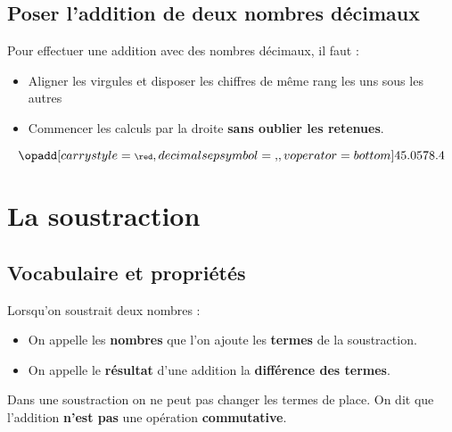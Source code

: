 \begin{pageCours}

\subsection{Poser l'addition de deux nombres décimaux}

\begin{Mt}
Pour effectuer une addition avec des nombres décimaux, il faut :
\begin{itemize}
    \item Aligner les virgules et disposer les chiffres de même rang les uns sous les autres
    \item Commencer les calculs par la droite \textbf{sans oublier les retenues}.
\end{itemize}
\bigskip
\[\opadd[carrystyle=\scriptsize\red,
decimalsepsymbol={,},
voperator=bottom]{45.05}{78.4}\]
\end{Mt} 


\section{La soustraction}

\subsection{Vocabulaire et propriétés}

\begin{Def}
Lorsqu'on soustrait deux nombres :
\begin{itemize}
\item On appelle les \textbf{nombres} que l'on ajoute les \textbf{termes} de la soustraction.
\item On appelle le \textbf{résultat} d'une addition la \textbf{différence des termes}.
\end{itemize}
\end{Def}

\begin{Prop}
Dans une soustraction on ne peut pas changer les termes de place. On dit que l'addition \textbf{n'est pas} une opération \textbf{commutative}.
\end{Prop}


\end{pageCours}
